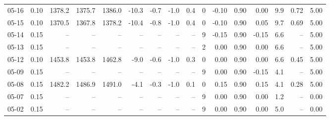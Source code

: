 \begin{threeparttable}
{\begin{tabular}{lrrrrrrrrrrrrrrr}
  05-16 &     0.10 & 1378.2 & 1375.7 & 1386.0 &      -10.3 &           -0.7 &                     -1.0 &                 0.4 &              0 &      -0.10 &      0.90 &           0.00 &              9.9 &            0.72 &                   5.00 \\
  05-15 &     0.10 & 1370.5 & 1367.8 & 1378.2 &      -10.4 &           -0.8 &                     -1.0 &                 0.4 &              0 &      -0.10 &      0.90 &           0.05 &              9.7 &            0.69 &                   5.00 \\
  05-14 &     0.15 &     -- &     -- &     -- &         -- &             -- &                       -- &                  -- &              9 &      -0.15 &      0.90 &          -0.15 &              6.6 &              -- &                   5.00 \\
  05-13 &     0.15 &     -- &     -- &     -- &         -- &             -- &                       -- &                  -- &              2 &       0.00 &      0.90 &           0.00 &              6.6 &              -- &                   5.00 \\
  05-12 &     0.10 & 1453.8 & 1453.8 & 1462.8 &       -9.0 &           -0.6 &                     -1.0 &                 0.3 &              0 &       0.00 &      0.90 &           0.00 &              6.6 &            0.45 &                   5.00 \\
  05-09 &     0.15 &     -- &     -- &     -- &         -- &             -- &                       -- &                  -- &              9 &       0.00 &      0.90 &          -0.15 &              4.1 &              -- &                   5.00 \\
  05-08 &     0.15 & 1482.2 & 1486.9 & 1491.0 &       -4.1 &           -0.3 &                     -1.0 &                 0.1 &              0 &       0.15 &      0.90 &           0.15 &              4.1 &            0.28 &                   5.00 \\
  05-07 &     0.15 &     -- &     -- &     -- &         -- &             -- &                       -- &                  -- &              9 &       0.00 &      0.90 &           0.00 &              1.2 &              -- &                   0.00 \\
  05-02 &     0.15 &     -- &     -- &     -- &         -- &             -- &                       -- &                  -- &              9 &       0.00 &      0.90 &           0.00 &              5.0 &              -- &                   0.00 \\

\end{tabular}}
\end{threeparttable}

